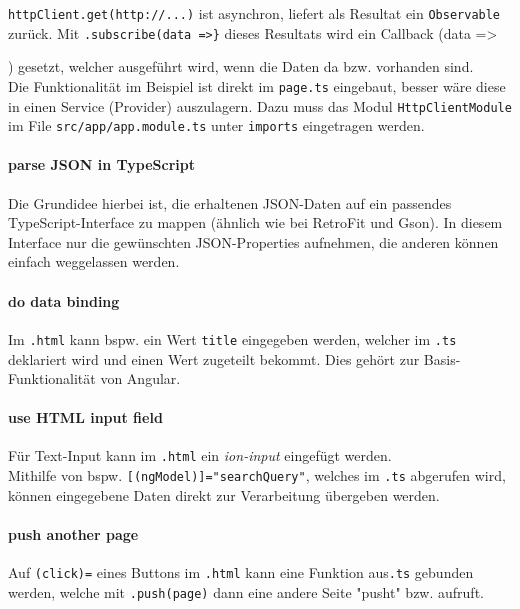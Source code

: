\documentclass[a4paper]{article}
\begin{document}
		\texttt{httpClient.get(http://...)} ist asynchron, liefert als Resultat ein \texttt{Observable} zurück.
		Mit \texttt{.subscribe(data =>\}} dieses Resultats wird ein Callback (data => {) gesetzt, welcher ausgeführt wird, wenn die Daten da bzw. vorhanden sind.\\
		Die Funktionalität im Beispiel ist direkt im \texttt{page.ts} eingebaut, besser wäre diese in einen Service (Provider) auszulagern. Dazu muss das Modul \texttt{HttpClientModule} im File \texttt{src/app/app.module.ts} unter \texttt{imports} eingetragen werden.
		
		\paragraph{parse JSON in TypeScript}
		
		Die Grundidee hierbei ist, die erhaltenen JSON-Daten auf ein passendes TypeScript-Interface zu mappen (ähnlich wie bei RetroFit und Gson). 
		In diesem Interface nur die gewünschten JSON-Properties aufnehmen, die anderen können einfach weggelassen werden.
		
		\paragraph{do data binding}
		
		Im \texttt{.html} kann bspw. ein Wert \texttt{title} eingegeben werden, welcher im \texttt{.ts} deklariert wird und einen Wert zugeteilt bekommt.
		Dies gehört zur Basis-Funktionalität von Angular.
		
		\paragraph{use HTML input field}
		
		Für Text-Input kann im \texttt{.html} ein \textit{ion-input} eingefügt werden. \\
		Mithilfe von bspw. \texttt{[(ngModel)]="searchQuery"}, welches im \texttt{.ts} abgerufen wird, können eingegebene Daten direkt zur Verarbeitung übergeben werden.
		
		\paragraph{push another page}
		
		Auf \texttt{(click)=} eines Buttons im \texttt{.html} kann eine Funktion aus\texttt{.ts} gebunden werden, welche mit \texttt{.push(page)} dann eine andere Seite "pusht" bzw. aufruft.
		
}
\end{document}
